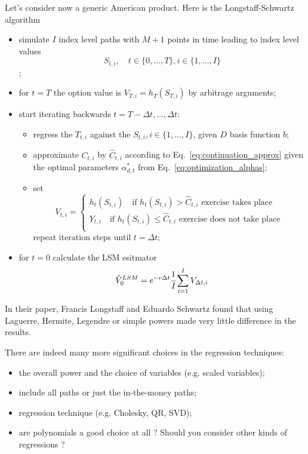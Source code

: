 \documentclass[12pt,a4paper]{book}
\begin{document}
Let's consider now a generic American product. Here is the Longstaff-Schwartz algorithm
\begin{itemize}
	\item simulate $I$ index level paths with $M+1$ points in time leading to index level values
	\begin{equation*}
		S_{t,i},\quad t \in \{0,\ldots,T\}, i \in \{1,\ldots,I\}
	\end{equation*};
	\item for $t=T$ the option value is $V_{T,i}=h_T(S_{T,i})$ by arbitrage arguments;
	\item start iterating backwards $t = T-\Delta t, \ldots,\Delta t$:
	\begin{itemize}
		\item regress the $T_{t,i}$ against the $S_{t,i}, i\in \{1,\ldots, I\}$, given $D$ basis function $b$;
		\item approximate $C_{t,i}$ by $\hat{C}_{t,i}$ according to Eq.~\ref{eq:continuation_approx} given the optimal parameters $\alpha^*_{d,t}$ from Eq.~\ref{eq:optimization_alphas};
		\item set 
		\begin{equation*}
			V_{t,i}=
			\begin{cases}
				h_t(S_{t,i})\quad\text{if }h_t(S_{t,i})>\hat{C}_{t,i}\text{ exercise takes place}\\
				Y_{t,i}\quad\text{if }h_t(S_{t,i})\leq\hat{C}_{t,i}\text{ exercise does not take place}\\
			\end{cases}
		\end{equation*}
		repeat iteration steps until $t=\Delta t$;
	\end{itemize} 
	\item for $t=0$ calculate the LSM esitmator
	\begin{equation}
		\hat{V}_0^{LSM}=e^{-r\Delta t}\cfrac{1}{I}\sum_{i=1}^{I}V_{\Delta t, i}
	\end{equation} 
\end{itemize}

In their paper, Francis Longstaff and Eduardo Schwartz found that using Laguerre, Hermite, Legendre or simple powers made very little difference in the results. 

There are indeed many more significant choices in the regression techniques:
\begin{itemize}
\item the overall power and the choice of variables (e.g. scaled variables);
\item include all paths or just the in-the-money paths;
\item regression technique (e.g. Cholesky, QR, SVD);
\item are polynomials a good choice at all ? Should you consider other kinds of regressions ?
\end{itemize}
\end{document}
